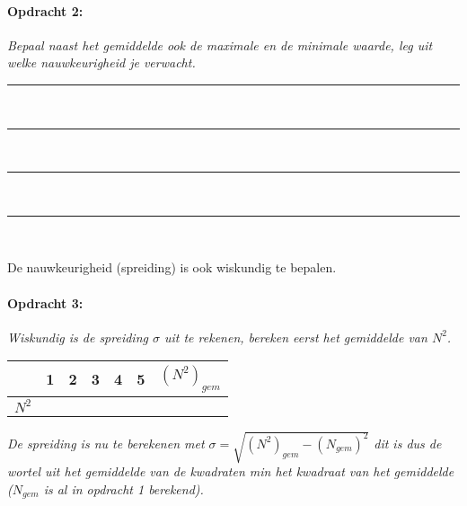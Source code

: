 \bigskip{}

\begin{minipage}[t]{1\columnwidth}%

\paragraph{Opdracht 2:}

\textit{Bepaal naast het gemiddelde ook de maximale en de minimale
waarde, leg uit welke nauwkeurigheid je verwacht.}

\begin{center}
    \rule{\textwidth}{0.3mm}\\
    \rule{\textwidth}{0.3mm}\\
    \rule{\textwidth}{0.3mm}\\
    \rule{\textwidth}{0.3mm}\\
\end{center}
\end{minipage}

\bigskip{}


De nauwkeurigheid (spreiding) is ook wiskundig te bepalen.

\begin{minipage}[t]{1\columnwidth}%

\paragraph{Opdracht 3:}

\textit{Wiskundig is de spreiding $\sigma$ uit te rekenen, bereken
eerst het gemiddelde van $N^{2}$.}

\bigskip{}


\begin{tabular}{|x{.11\textwidth}|x{.11\textwidth}|x{.11\textwidth}
                |x{.11\textwidth}|x{.11\textwidth}|x{.11\textwidth}
                |x{.11\textwidth}|}
 & 1 & 2 & 3 & 4 & 5 & $\left(N^{2}\right)_{gem}$\\
\hline 
$N^{2}$ &  &  &  &  &  & \\
\hline 
\end{tabular}

\bigskip{}

\textit{De spreiding is nu te berekenen met
$\sigma=\sqrt{\left(N^{2}\right)_{gem}-\left(N_{gem}\right)^{2}}$ dit is
dus de wortel uit het gemiddelde van de kwadraten min het kwadraat van
het gemiddelde ($N_{gem}$ is al in opdracht 1 berekend).}

\end{minipage}

